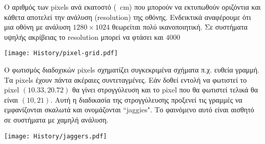 Ο αριθμός των pixels ανά εκατοστό (\SI{}{\cm}) που μπορούν να εκτυπωθούν οριζόντια και κάθετα αποτελεί την ανάλυση (resolution) της οθόνης. Ενδεικτικά αναφέρουμε ότι μια οθόνη με ανάλυση $1280 \times 1024$ θεωρείται πολύ ικανοποιητική. Σε συστήματα υψηλής ακρίβειας το resolution μπορεί να φτάσει και $4000$

\begin{center}
	\texttt{[image: History/pixel-grid.pdf]}
\end{center}


%
 Ο φωτισμός διαδοχικών pixels σχηματίζει συγκεκριμένα σχήματα π.χ. ευθεία γραμμή.
Τα pixels έχουν πάντα ακέραιες συντεταγμένες. Εάν δοθεί εντολή να φωτιστεί το pixel $(10.33, 20.72)$ θα γίνει στρογγύλευση και το pixel που θα φωτιστεί τελικά θα είναι $(10, 21)$. Αυτή η διαδικασία της στρογγύλευσης προξενεί τις γραμμές να εμφανίζονται σκαλωτά και ονομάζονται ``jaggies". Το φαινόμενο αυτό είναι αισθητό σε συστήματα με χαμηλή ανάλυση.


\begin{center}
	\texttt{[image: History/jaggers.pdf]}
\end{center}